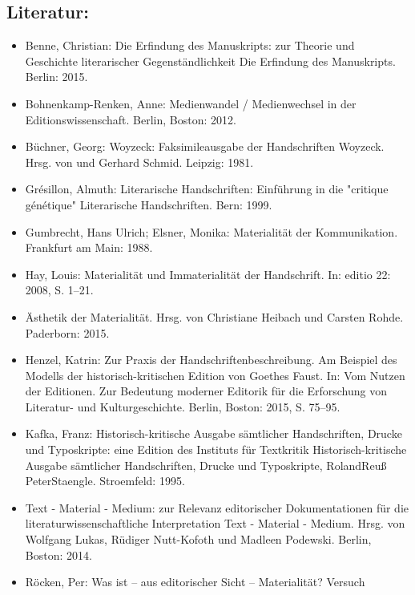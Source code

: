 \documentclass{article}
\begin{document}
        \subsection*{Literatur:}\begin{itemize}\item Benne, Christian: Die Erfindung des Manuskripts: zur Theorie und
                              Geschichte literarischer Gegenständlichkeit Die Erfindung des Manuskripts. Berlin: 2015.\item Bohnenkamp-Renken, Anne: Medienwandel / Medienwechsel in der
                              Editionswissenschaft. Berlin, Boston: 2012.\item Büchner, Georg: Woyzeck: Faksimileausgabe der Handschriften Woyzeck. Hrsg. von  und Gerhard Schmid. Leipzig: 1981.\item Grésillon, Almuth: Literarische Handschriften: Einführung in die "critique
                              génétique" Literarische Handschriften. Bern: 1999.\item Gumbrecht, Hans Ulrich; Elsner, Monika: Materialität der Kommunikation. Frankfurt am Main: 1988.\item Hay, Louis: Materialität und Immaterialität der Handschrift. In: editio 22: 2008, S. 1–21.\item Ästhetik der Materialität. Hrsg. von Christiane Heibach und Carsten Rohde. Paderborn: 2015.\item Henzel, Katrin: Zur Praxis der Handschriftenbeschreibung. Am Beispiel
                              des Modells der historisch-kritischen Edition von Goethes
                              Faust. In: Vom Nutzen der Editionen. Zur Bedeutung moderner
                              Editorik für die Erforschung von Literatur- und
                              Kulturgeschichte. Berlin, Boston: 2015, S. 75–95.\item Kafka, Franz: Historisch-kritische Ausgabe sämtlicher Handschriften,
                              Drucke und Typoskripte: eine Edition des Instituts für
                              Textkritik Historisch-kritische Ausgabe sämtlicher
                              Handschriften, Drucke und Typoskripte, RolandReuß PeterStaengle. Stroemfeld: 1995.\item Text - Material - Medium: zur Relevanz editorischer
                              Dokumentationen für die literaturwissenschaftliche
                              Interpretation Text - Material - Medium. Hrsg. von Wolfgang Lukas, Rüdiger Nutt-Kofoth und Madleen Podewski. Berlin, Boston: 2014.\item Röcken, Per: Was ist – aus editorischer Sicht – Materialität? Versuch

\end{itemize}
\end{document}
